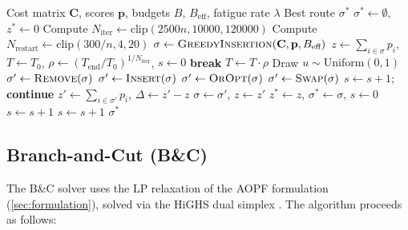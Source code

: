 \documentclass[11pt,a4paper]{article}
\begin{document}
\begin{algorithm}[H]
\caption{Iterated Simulated Annealing for AOPF}
\label{alg:sa}
\begin{algorithmic}[1]
\Require Cost matrix $\mathbf{C}$, scores $\mathbf{p}$, budgets $B$, $B_{\text{eff}}$, fatigue rate $\lambda$
\Ensure Best route $\sigma^*$
\State $\sigma^* \gets \emptyset$, $z^* \gets 0$
\State Compute $N_{\text{iter}} \gets \text{clip}(2500n, 10000, 120000)$
\State Compute $N_{\text{restart}} \gets \text{clip}(300/n, 4, 20)$
  \State $\sigma \gets \textsc{GreedyInsertion}(\mathbf{C}, \mathbf{p}, B_{\text{eff}})$
  \State $z \gets \sum_{i \in \sigma} p_i$, \; $T \gets T_0$, \; $\rho \gets (T_{\text{end}}/T_0)^{1/N_{\text{iter}}}$, \; $s \gets 0$
     \textbf{break} 
    \EndIf
    \State $T \gets T \cdot \rho$
    \State Draw $u \sim \text{Uniform}(0,1)$
      \State $\sigma' \gets \textsc{Remove}(\sigma)$ 
      \State $\sigma' \gets \textsc{Insert}(\sigma)$ 
      \State $\sigma' \gets \textsc{OrOpt}(\sigma)$ 
    \Else
      \State $\sigma' \gets \textsc{Swap}(\sigma)$ 
    \EndIf
      \State $s \gets s + 1$; \textbf{continue} 
    \EndIf
    \State $z' \gets \sum_{i \in \sigma'} p_i$, \; $\Delta \gets z' - z$
      \State $\sigma \gets \sigma'$, \; $z \gets z'$
       $z^* \gets z$, \; $\sigma^* \gets \sigma$, \; $s \gets 0$
      \Else \; $s \gets s + 1$
      \EndIf
    \Else \; $s \gets s + 1$
    \EndIf
  \EndFor
\EndFor
\State \Return $\sigma^*$
\end{algorithmic}
\end{algorithm}

\subsection{Branch-and-Cut (B\&C)}
\label{sec:bnc}

The B\&C solver uses the LP relaxation of the AOPF formulation (\cref{sec:formulation}), solved via the HiGHS dual simplex \citep{huangfu2018highs}.
The algorithm proceeds as follows:
\end{document}

